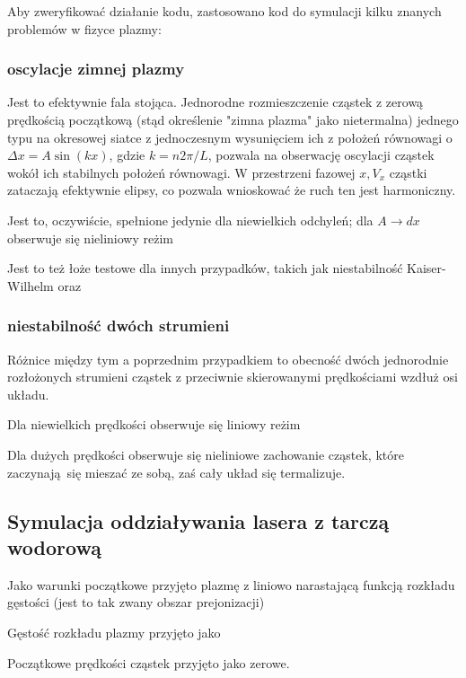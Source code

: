     Aby zweryfikować działanie kodu, zastosowano kod do symulacji kilku znanych problemów w fizyce plazmy:
    \subsubsection{oscylacje zimnej plazmy}
    Jest to efektywnie fala stojąca. Jednorodne rozmieszczenie cząstek z zerową prędkością początkową (stąd określenie
    "zimna plazma" jako nietermalna)
    jednego typu na okresowej siatce z jednoczesnym wysunięciem ich z położeń równowagi o $\Delta x = A \sin(kx)$,
    gdzie $k = n 2 \pi / L$, pozwala na obserwację
    oscylacji cząstek wokół ich stabilnych położeń równowagi. W przestrzeni fazowej $x, V_x$ cząstki zataczają efektywnie
    elipsy, co pozwala wnioskować że ruch ten jest harmoniczny.

    Jest to, oczywiście, spełnione jedynie dla niewielkich odchyleń; dla $A \to dx$ %
    obserwuje się nieliniowy reżim %

    Jest to też łoże testowe %
    dla innych przypadków, takich jak niestabilność Kaiser-Wilhelm %
    oraz %
    \subsubsection{niestabilność dwóch strumieni} %
    Różnice między tym a poprzednim przypadkiem to obecność dwóch jednorodnie rozłożonych strumieni cząstek
    z przeciwnie skierowanymi prędkościami wzdłuż osi układu.

    Dla niewielkich prędkości %
    obserwuje się liniowy reżim %

    Dla dużych prędkości %
     obserwuje się nieliniowe zachowanie cząstek, które zaczynają się mieszać ze sobą, zaś cały układ się termalizuje.
    \subsection{Symulacja oddziaływania lasera z tarczą wodorową}

    Jako warunki początkowe przyjęto plazmę z liniowo narastającą funkcją rozkładu gęstości (jest to tak zwany obszar prejonizacji) %

    Gęstość rozkładu plazmy przyjęto jako

    Początkowe prędkości cząstek przyjęto jako zerowe. %

